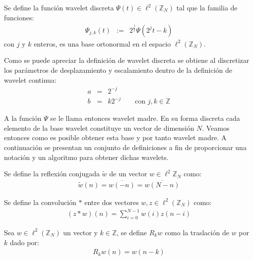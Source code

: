 \begin{definition}
Se define la funci\'on wavelet discreta $\Psi(t)\in \ell^2(\mathbb{Z}_N)$ tal que la familia de funciones:
\begin{eqnarray}
\Psi_{j,k}(t)&:=&2^{\frac{j}{2}}\Psi(2^jt-k)\nonumber
\end{eqnarray}
con $j$ y $k$ enteros, es una base ortonormal en el espacio $\ell^2(\mathbb{Z}_N)$.
\label{wav-discreta}
\end{definition}

\par Como se puede apreciar la definici\'on de wavelet discreta se obtiene al discretizar los parámetros de desplazamiento y escalamiento dentro de la definici\'on de wavelet continua:
\begin{eqnarray}
a&=&2^{-j}\nonumber\\
b&=&k2^{-j}\qquad\mbox{con $j,k\in \mathbb{Z}$}\nonumber
\end{eqnarray}

\par A la funci\'on $\Psi$ se le llama entonces wavelet madre. En su forma discreta cada elemento de la base wavelet constituye un vector de dimensi\'on $N$. Veamos entonces como es posible obtener esta base y por tanto wavelet madre. A continuaci\'on se presentan un conjunto de definiciones a fin de proporcionar una notaci\'on y un algoritmo para obtener dichas wavelets.\\

\begin{definition}
Se define la reflexi\'on conjugada $\tilde{w}$ de un vector $w\in \ell^2\mathbb{Z}_N$ como:
\begin{eqnarray}
\tilde{w}(n)=\overline{w(-n)}=\overline{w(N-n)}\nonumber
\end{eqnarray}
\end{definition}

\begin{definition}
Se define la convoluci\'on $\ast$ entre dos vectores $w,z\in \ell^2(\mathbb{Z}_N)$ como:
\begin{eqnarray}
(z \ast w )(n) = \sum_{i=0}^{N-1}w(i)z(n-i)\nonumber
\end{eqnarray}
\end{definition}

\begin{definition}
Sea $w\in \ell^2(\mathbb{Z}_N)$ un vector y $k\in\mathbb{Z}$, se define $R_kw$ como la traslaci\'on de $w$ por $k$ dado por:
\begin{eqnarray}
R_kw(n)=w(n-k)\nonumber
\end{eqnarray}
\end{definition}

